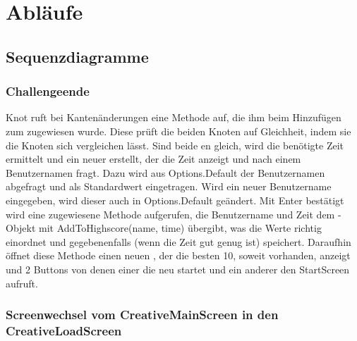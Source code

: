 \chapter{Abläufe}

\section{Sequenzdiagramme}

\subsection{Challengeende}

Knot ruft bei Kantenänderungen eine Methode auf, die ihm beim Hinzufügen zum  zugewiesen wurde. Diese prüft die beiden Knoten auf Gleichheit, indem sie die Knoten sich vergleichen lässt. Sind beide en gleich, wird die benötigte Zeit ermittelt und ein neuer  erstellt, der die Zeit anzeigt und nach einem Benutzernamen fragt.
\newline
\newline
Dazu wird aus Options.Default der Benutzernamen abgefragt und als Standardwert eingetragen. Wird ein neuer Benutzername eingegeben, wird dieser auch in Options.Default geändert. Mit Enter bestätigt wird eine zugewiesene Methode aufgerufen, die Benutzername und Zeit dem -Objekt mit AddToHighscore(name, time) übergibt, was die Werte richtig einordnet und gegebenenfalls (wenn die Zeit gut genug ist) speichert.
\newline
\newline
Daraufhin öffnet diese Methode einen neuen , der die besten 10, soweit vorhanden, anzeigt und 2 Buttons 
von denen einer die  neu startet und ein anderer den StartScreen aufruft.

\subsection{Screenwechsel vom CreativeMainScreen in den CreativeLoadScreen}

